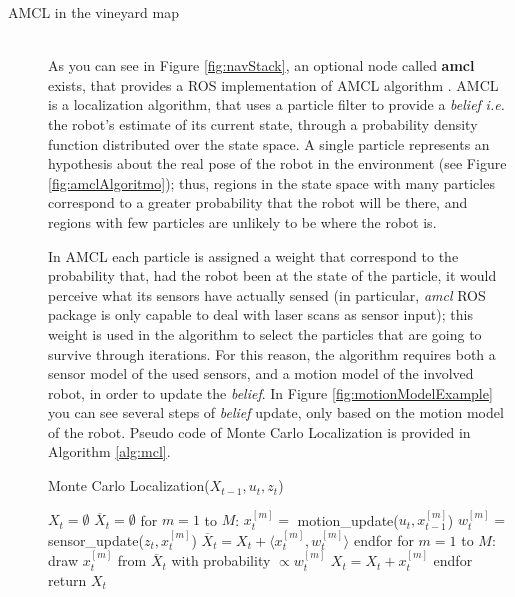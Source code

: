 \begin{description}
\item[AMCL in the vineyard map] \hfill \\
As you can see in Figure \ref{fig:navStack}, an optional node called \textbf{amcl} exists, that provides a \ac{ROS} implementation of \ac{AMCL} algorithm \parencite{amcl}. \ac{AMCL} is a localization algorithm, that uses a particle filter to provide a \textit{belief} \textit{i.e.} the robot's estimate of its current state, through a probability density function distributed over the state space. A single particle represents an hypothesis about the real pose of the robot in the environment (see Figure \ref{fig:amclAlgoritmo}); thus, regions in the state space with many particles correspond to a greater probability that the robot will be there, and regions with few particles are unlikely to be where the robot is.

\par In \ac{AMCL} each particle is assigned a weight that correspond to the probability that, had the robot been at the state of the particle, it would perceive what its sensors have actually sensed (in particular, \textit{amcl} \ac{ROS} package is only capable to deal with laser scans as sensor input); this weight is used in the algorithm to select the particles that are going to survive through iterations. For this reason, the algorithm requires both a sensor model of the used sensors, and a motion model of the involved robot, in order to update the \textit{belief}. In Figure \ref{fig:motionModelExample} you can see several steps of \textit{belief} update, only based on the motion model of the robot. Pseudo code of Monte Carlo Localization is provided in Algorithm \ref{alg:mcl}.

\begin{algorithm}
\caption{Monte Carlo Localization($X_{t-1},u_t,z_t$)}\label{alg:mcl}
\begin{algorithmic}[1]
\State $X_t=\emptyset$ 				
\State $\overline{X}_t=\emptyset$
\State for $m=1$ to $M$: 				
\Indent
	\State $x^{[m]}_t=$ motion\_update($u_t,x^{[m]}_{t-1}$)	 
	\State $w^{[m]}_t=$ sensor\_update($z_t,x^{[m]}_{t}$)	
	\State $\overline{X}_t = {X}_t + \big \langle x^{[m]}_t, w^{[m]}_t \big \rangle$
\EndIndent
\State endfor
\State for $m=1$ to $M$: 
\Indent
	\State draw $x^{[m]}_t$ from $\overline{X}_t$ with probability $\propto w^{[m]}_t$
	\State $X_t=X_t+x^{[m]}_t$
\EndIndent
\State endfor
\State return $X_t$
\end{algorithmic}
\end{algorithm}


\end{description}
